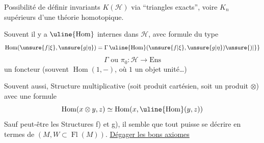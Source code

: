  Possibilité de définir  invariants
$K(\mathcal H)$ via ``triangles exacts'', voire $K_n$
supérieurs d'une théorie homotopique.

 Souvent il y a  $\uline{\operatorname{Hom}}$ internes
dans $\mathcal H$, avec  formule du type
\[
\operatorname{Hom}(\unsure{f|\xi},\unsure{g|\eta})
=\Gamma\,\uline{\operatorname{Hom}}(\unsure{f|\xi},\unsure{g|\eta})\unsure{)|\}}
\]
\[
\Gamma\text{ ou }\pi_0:\mathcal H\longrightarrow\mathrm{Ens}
\]
un foncteur  (souvent
$\operatorname{Hom}(1,-)$, où $1$ un objet unité\ldots)

Souvent aussi, Structure multiplicative
(soit produit cartésien, soit un produit $\otimes$)
avec une formule
\[
\operatorname{Hom}(x\otimes y,z)\simeq
\operatorname{Hom}(x,\uline{\operatorname{Hom}}(y,z))
\]
Sauf peut-être les Structures
f) et g), il semble que tout puisse
se décrire en termes de $(M,W\subset\operatorname{Fl}(M))$.
\uline{Dégager les bons axiomes}
